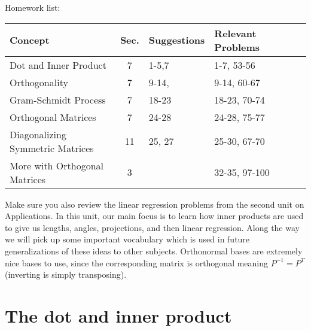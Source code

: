 \documentclass[10pt]{article}
\theoremstyle{plain}
\theoremstyle{box}
\begin{document}
Homework list:
\begin{center}
\begin{tabular}{|l|c|l|l|l|l|}
\hline
Concept&Sec.&Suggestions&Relevant Problems\\ \hline
Dot and Inner Product&7&1-5,7&1-7, 53-56\\ \hline
Orthogonality&7&9-14,&9-14, 60-67\\ \hline
Gram-Schmidt Process&7&18-23&18-23, 70-74\\ \hline
Orthogonal Matrices&7&24-28&24-28, 75-77\\ \hline
Diagonalizing Symmetric Matrices&11&25, 27&25-30, 67-70\\ \hline
More with Orthogonal Matrices&3&&32-35, 97-100\\ \hline
\end{tabular}
\end{center}
Make sure you also review the linear regression problems from the second unit on Applications.  In this unit, our main focus is to learn how inner products are used to give us lengths, angles, projections, and then linear regression. Along the way we will pick up some important vocabulary which is used in future generalizations of these ideas to other subjects.  Orthonormal bases are extremely nice bases to use, since the corresponding matrix is orthogonal meaning $P^{-1}=P^T$ (inverting is simply transposing).






\section{The dot and inner product}
\end{document}

